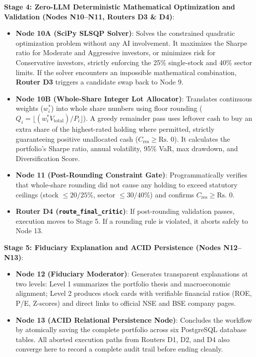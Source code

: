 \noindent \textbf{Stage 4: Zero-LLM Deterministic Mathematical Optimization and Validation (Nodes N10--N11, Routers D3 \& D4)}:
\begin{itemize}
    \item \textbf{Node 10A (SciPy SLSQP Solver)}: Solves the constrained quadratic optimization problem without any AI involvement. It maximizes the Sharpe ratio for Moderate and Aggressive investors, or minimizes risk for Conservative investors, strictly enforcing the 25\% single-stock and 40\% sector limits. If the solver encounters an impossible mathematical combination, \textbf{Router D3} triggers a candidate swap back to Node 9.
    \item \textbf{Node 10B (Whole-Share Integer Lot Allocator)}: Translates continuous weights ($w_i^*$) into whole share numbers using floor rounding ($Q_i = \lfloor (w_i^* V_{\text{total}}) / P_i \rfloor$). A greedy remainder pass uses leftover cash to buy an extra share of the highest-rated holding where permitted, strictly guaranteeing positive unallocated cash ($C_{\text{res}} \ge \text{Rs.~}0$). It calculates the portfolio's Sharpe ratio, annual volatility, 95\% VaR, max drawdown, and Diversification Score.
    \item \textbf{Node 11 (Post-Rounding Constraint Gate)}: Programmatically verifies that whole-share rounding did not cause any holding to exceed statutory ceilings (stock $\le 20/25\%$, sector $\le 30/40\%$) and confirms $C_{\text{res}} \ge \text{Rs.~}0$.
    \item \textbf{Router D4 (\texttt{route\_final\_critic})}: If post-rounding validation passes, execution moves to Stage 5. If a rounding rule is violated, it aborts safely to Node 13.
\end{itemize}

\noindent \textbf{Stage 5: Fiduciary Explanation and ACID Persistence (Nodes N12--N13)}:
\begin{itemize}
    \item \textbf{Node 12 (Fiduciary Moderator)}: Generates transparent explanations at two levels: Level 1 summarizes the portfolio thesis and macroeconomic alignment; Level 2 produces stock cards with verifiable financial ratios (ROE, P/E, Z-scores) and direct links to official NSE and BSE company pages.
    \item \textbf{Node 13 (ACID Relational Persistence Node)}: Concludes the workflow by atomically saving the complete portfolio across six PostgreSQL database tables. All aborted execution paths from Routers D1, D2, and D4 also converge here to record a complete audit trail before ending cleanly.
\end{itemize}

